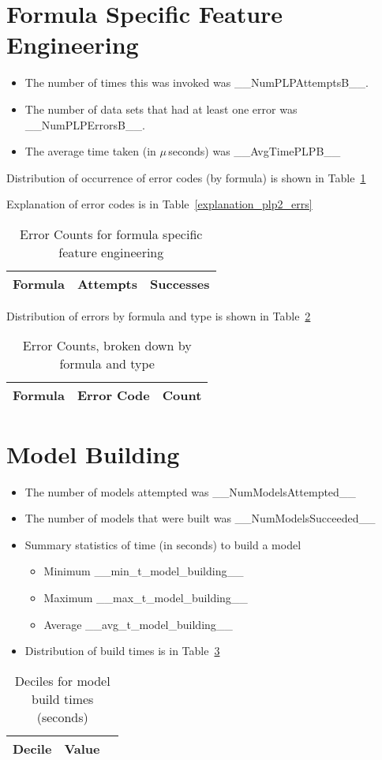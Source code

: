 \documentclass[letterpaper,12pt]{article}
\newcommand{\bi}{\begin{itemize}}
\newcommand{\ei}{\end{itemize}}
\newcommand{\NumPLPErrorsB}{__NumPLPErrorsB__}
\newcommand{\NumPLPAttemptsB}{__NumPLPAttemptsB__}
\newcommand{\AvgTimePLPB}{__AvgTimePLPB__}
\newcommand{\NumModelsAttempted}{__NumModelsAttempted__}
\newcommand{\NumModelsSucceeded}{__NumModelsSucceeded__}
\newcommand{\ModelMinTime}{__min_t_model_building__}
\newcommand{\ModelMaxTime}{__max_t_model_building__}
\newcommand{\ModelAvgTime}{__avg_t_model_building__}
\begin{document}
\section{Formula Specific Feature Engineering}
\label{PLP2}

\bi
\item The number of times this was invoked was \NumPLPAttemptsB.
\item The number of data sets that had at least one error was
  \NumPLPErrorsB.
\item The average time taken (in \(\mu\,\)seconds) was \AvgTimePLPB
\ei

Distribution of occurrence of error codes (by formula) is shown in Table~\ref{plp2_errs}

Explanation of error codes is in Table~\ref{explanation_plp2_errs}
\begin{table}
  \centering
  \begin{tabular}{|l|l|l|} \hline \hline
    {\bf Formula} & {\bf Attempts} & {\bf Successes} \\ \hline 
     
    \hline
  \end{tabular}
  \caption{Error Counts for formula specific feature engineering}
  \label{plp2_errs}
\end{table}

Distribution of errors by formula and type is shown in Table~\ref{plp2_errs_B}
\begin{table}
  \centering
  \begin{tabular}{|l|l|l|} \hline \hline
    {\bf Formula} & {\bf Error Code} & {\bf Count} \\ \hline 
      
    \hline
  \end{tabular}
  \caption{Error Counts, broken down by formula and type}
  \label{plp2_errs_B}
\end{table}

\section{Model Building}
\bi
\item The number of models attempted was \NumModelsAttempted
\item The number of models that were built was \NumModelsSucceeded
\item Summary statistics of time (in seconds) to build a model
  \bi
\item Minimum \ModelMinTime
\item Maximum \ModelMaxTime
\item Average \ModelAvgTime
\ei
\item Distribution of build times is in Table~\ref{tbl_model_build_times}
\ei
\begin{table}
  \centering
  \begin{tabular}{|l|l|l|} \hline \hline
    {\bf Decile} & {\bf Value}  \\ \hline
     
    \hline
  \end{tabular}
  \caption{Deciles for model build times (seconds)}
  \label{tbl_model_build_times}
\end{table}
\end{document}
